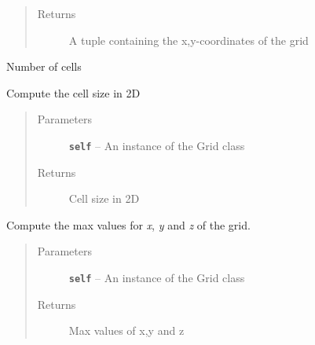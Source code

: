 \documentclass[letterpaper,10pt,english]{sphinxmanual}
\begin{document}
\begin{fulllineitems}
\begin{fulllineitems}
\begin{quote}
\begin{description}
\item[{Returns}] \leavevmode
A tuple containing the x,y-coordinates of the grid

\end{description}\end{quote}

\end{fulllineitems}


\begin{fulllineitems}
\label{hyvr:hyvr.hyvr.grid.Grid.cells}
Number of cells

\end{fulllineitems}


\begin{fulllineitems}
\label{hyvr:hyvr.hyvr.grid.Grid.cellsize_2d}
Compute the cell size in 2D
\begin{quote}\begin{description}
\item[{Parameters}] \leavevmode
\textbf{\texttt{self}} -- An instance of the Grid class

\item[{Returns}] \leavevmode
Cell size in 2D

\end{description}\end{quote}

\end{fulllineitems}


\begin{fulllineitems}
\label{hyvr:hyvr.hyvr.grid.Grid.compute_max}
Compute the max values for \emph{x}, \emph{y} and \emph{z} of the grid.
\begin{quote}\begin{description}
\item[{Parameters}] \leavevmode
\textbf{\texttt{self}} -- An instance of the Grid class

\item[{Returns}] \leavevmode
Max values of x,y and z

\end{description}\end{quote}


\end{fulllineitems}
\end{fulllineitems}
\end{document}
